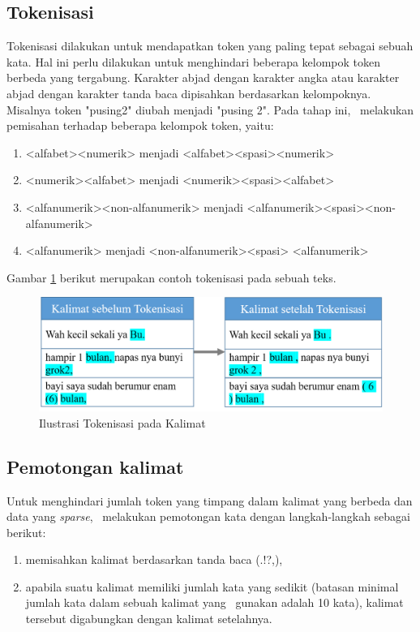 	
\subsection{Tokenisasi}
Tokenisasi dilakukan untuk mendapatkan token yang paling tepat sebagai sebuah kata. Hal ini perlu dilakukan untuk menghindari beberapa kelompok token berbeda yang tergabung. Karakter abjad dengan karakter angka atau karakter abjad dengan karakter tanda baca dipisahkan berdasarkan kelompoknya. Misalnya token "pusing2" diubah menjadi "pusing 2". Pada tahap ini, \saya~melakukan pemisahan terhadap beberapa kelompok token, yaitu:
\begin{enumerate}
	\item <alfabet><numerik> menjadi <alfabet><spasi><numerik>
	\item <numerik><alfabet> menjadi <numerik><spasi><alfabet>
	\item <alfanumerik><non-alfanumerik> menjadi <alfanumerik><spasi><non-alfanumerik>
	\item <non-alfanumerik><alfanumerik> menjadi <non-alfanumerik><spasi> <alfanumerik>
\end{enumerate}

Gambar \ref{fig:tokenisasi} berikut merupakan contoh tokenisasi pada sebuah teks.
\begin{figure}
	\centering
	\includegraphics[width=\linewidth]{images/tokenisasi}
	\caption{Ilustrasi Tokenisasi pada Kalimat}
	\label{fig:tokenisasi}
\end{figure}

	
\subsection{Pemotongan kalimat}
Untuk menghindari jumlah token yang timpang dalam kalimat yang berbeda dan data yang \textit{sparse}, \saya~melakukan pemotongan kata dengan langkah-langkah sebagai berikut:
\begin{enumerate}
	\item memisahkan kalimat berdasarkan tanda baca (.!?,),
	\item apabila suatu kalimat memiliki jumlah kata yang sedikit (batasan minimal jumlah kata dalam sebuah kalimat yang \saya~gunakan adalah 10 kata), kalimat tersebut digabungkan dengan kalimat setelahnya.
\end{enumerate}

